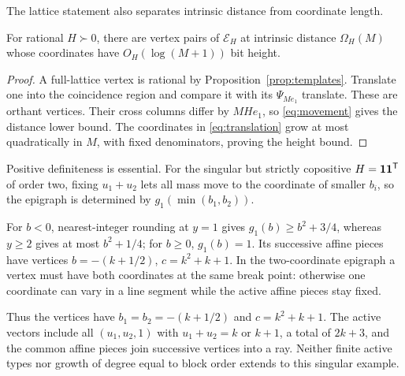 The lattice statement also separates intrinsic distance from coordinate length.

\begin{corollary}\label{cor:geometricencoding}
For rational $H\succ0$, there are vertex pairs of $\mathcal E_H$ at intrinsic distance $\Omega_H(M)$ whose coordinates have $O_H(\log(M+1))$ bit height.
\end{corollary}
\begin{proof}
A full-lattice vertex is rational by Proposition~\ref{prop:templates}. Translate one into the coincidence region and compare it with its $\Psi_{Me_1}$ translate. These are orthant vertices. Their cross columns differ by $MH e_1$, so \eqref{eq:movement} gives the distance lower bound. The coordinates in \eqref{eq:translation} grow at most quadratically in $M$, with fixed denominators, proving the height bound.
\end{proof}

Positive definiteness is essential. For the singular but strictly copositive $H=\mathbf1\mathbf1^{\mathsf T}$ of order two, fixing $u_1+u_2$ lets all mass move to the coordinate of smaller $b_i$, so the epigraph is determined by $g_1(\min(b_1,b_2))$.

For $b<0$, nearest-integer rounding at $y=1$ gives $g_1(b)\ge b^2+3/4$, whereas $y\ge2$ gives at most $b^2+1/4$; for $b\ge0$, $g_1(b)=1$. Its successive affine pieces have vertices $b=-(k+1/2)$, $c=k^2+k+1$. In the two-coordinate epigraph a vertex must have both coordinates at the same break point: otherwise one coordinate can vary in a line segment while the active affine pieces stay fixed.

Thus the vertices have $b_1=b_2=-(k+1/2)$ and $c=k^2+k+1$. The active vectors include all $(u_1,u_2,1)$ with $u_1+u_2=k$ or $k+1$, a total of $2k+3$, and the common affine pieces join successive vertices into a ray. Neither finite active types nor growth of degree equal to block order extends to this singular example.
